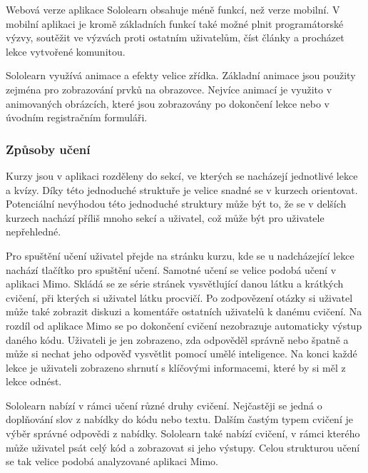 
Webová verze aplikace Sololearn obsahuje méně funkcí, než verze mobilní. V mobilní aplikaci je kromě základních funkcí také možné plnit programátorské výzvy, soutěžit ve výzvách proti ostatním uživatelům, číst články a procházet lekce vytvořené komunitou.  


Sololearn využívá animace a efekty velice zřídka. Základní animace jsou použity zejména pro zobrazování prvků na obrazovce. Nejvíce animací je využito v animovaných obrázcích, které jsou zobrazovány po dokončení lekce nebo v úvodním registračním formuláři.

\subsubsection{Způsoby učení}

Kurzy jsou v aplikaci rozděleny do sekcí, ve kterých se nacházejí jednotlivé lekce a kvízy. Díky této jednoduché struktuře je velice snadné se v kurzech orientovat. Potenciální nevýhodou této jednoduché struktury může být to, že se v delších kurzech nachází příliš mnoho sekcí a uživatel, což může být pro uživatele nepřehledné.  

Pro spuštění učení uživatel přejde na stránku kurzu, kde se u nadcházející lekce nachází tlačítko pro spuštění učení. Samotné učení se velice podobá učení v aplikaci Mimo. Skládá se ze série stránek vysvětlující danou látku a krátkých cvičení, při kterých si uživatel látku procvičí. Po zodpovězení otázky si uživatel může také zobrazit diskuzi a komentáře ostatních uživatelů k danému cvičení. Na rozdíl od aplikace Mimo se po dokončení cvičení nezobrazuje automaticky výstup daného kódu. Uživateli je jen zobrazeno, zda odpověděl správně nebo špatně a může si nechat jeho odpověď vysvětlit pomocí umělé inteligence. Na konci každé lekce je uživateli zobrazeno shrnutí s klíčovými informacemi, které by si měl z lekce odnést.

Sololearn nabízí v rámci učení různé druhy cvičení. Nejčastěji se jedná o doplňování slov z nabídky do kódu nebo textu. Dalším častým typem cvičení je výběr správné odpovědi z nabídky. Sololearn také nabízí cvičení, v rámci kterého může uživatel psát celý kód a zobrazovat si jeho výstupy. Celou strukturou učení se tak velice podobá analyzované aplikaci Mimo.

